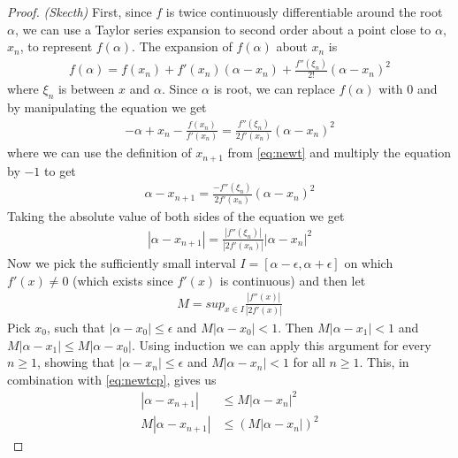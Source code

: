 \documentclass[
  digital, %
  table,   %
  nolof,     %
  nolot,     %
	draft, %
]{fithesis3}
\begin{document}
\begin{proof}
\textit{(Skecth)} First, since $f$ is twice continuously differentiable around the root $\alpha$, we can use a Taylor series expansion\parencite[p.~59]{rootApproxMeth} to second order about a point close to $\alpha$, $x_{n}$, to represent $f(\alpha)$. The expansion of $f(\alpha)$ about $x_{n}$ is 
\begin{align}
	f(\alpha) = f(x_{n}) + f'(x_{n})(\alpha - x_{n}) + \frac{f''(\xi_{n})}{2!}(\alpha - x_{n})^2
\end{align}
where $\xi_{n}$ is between $x$ and $\alpha$. Since $\alpha$ is root, we can replace $f(\alpha)$ with $0$ and by manipulating the equation we get
\begin{align}
  -\alpha + x_{n}	- \frac{f(x_{n})}{f'(x_{n})} = \frac{f''(\xi_{n})}{2f'(x_{n})}(\alpha - x_{n})^2
\end{align}
where we can use the definition of $x_{n+1}$ from \eqref{eq:newt} and multiply the equation by $-1$ to get
\begin{align}
  \alpha - x_{n+1} = \frac{-f''(\xi_{n})}{2f'(x_{n})}(\alpha - x_{n})^2 
\end{align}
Taking the absolute value of both sides of the equation we get
\begin{align}
  \left|\alpha - x_{n+1}\right| = \frac{\left|f''(\xi_{n})\right|}{\left|2f'(x_{n})\right|}\left|\alpha - x_{n}\right|^2 
	\label{eq:newtcp}
\end{align}
Now we pick the sufficiently small interval $I = [\alpha - \epsilon, \alpha + \epsilon]$ on which $f'(x) \neq 0$ (which exists since $f'(x)$ is continuous) and then let
\begin{align}
  M = sup_{x\in I}\frac{\left|f''(x)\right|}{\left|2f'(x)\right|}
\end{align}
Pick $x_{0}$, such that $\left|\alpha-x_{0}\right| \leq \epsilon$ and $M\left|\alpha-x_{0}\right| < 1$\parencite[p.~61]{rootApproxMeth}. Then $M\left|\alpha - x_{1}\right| < 1$ and $M\left|\alpha - x_{1}\right| \leq M\left|\alpha - x_{0}\right|$. Using induction we can apply this argument for every $n \geq 1$, showing that $\left|\alpha-x_{n}\right| \leq \epsilon$ and $M\left|\alpha-x_{n}\right| < 1$ for all $n \geq 1$.
This, in combination with \eqref{eq:newtcp}, gives us
\begin{align}
  \left|\alpha - x_{n+1}\right| &\leq M\left|\alpha - x_{n}\right|^2 \\
	M\left|\alpha - x_{n+1}\right| &\leq (M\left|\alpha - x_{n}\right|)^2 
\end{align}

\end{proof}
\end{document}

